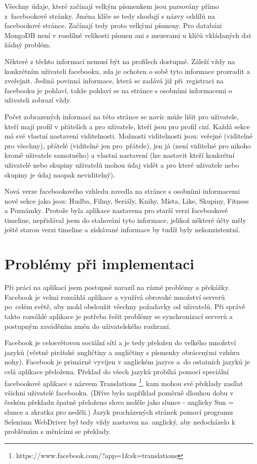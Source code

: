 \documentclass[thesis=M,czech]{FITthesis}[2013/05/10]
\begin{document}
Všechny údaje, které začínají velkým písmenkem jsou parsovány přímo z~facebookové stránky. Jména klíče se tedy shodují s názvy oddílů na facebookové stránce. Začínají tedy proto velkými písmeny. Pro databázi MongoDB není v rozdílné velikosti písmen ani s mezerami u klíčů vkládaných dat žádný problém.

Některé z těchto informací nemusí být na profilech dostupné. Záleží vždy na konkrétním uživateli facebooku, zda je ochoten o sobě tyto informace prozradit a zveřejnit. Jediná povinná informace, která se zadává již při~registraci na facebooku je pohlaví, takže pohlaví se na stránce s osobními informacemi o uživateli zobrazí vždy. 

Počet zobrazených informací na této stránce se navíc může lišit pro uživatele, kteří mají profil v přátelích a pro uživatele, kteří jsou pro profil cizí. Každá sekce má své vlastní nastavení viditelnosti. Možnosti viditelnosti jsou: veřejné (viditelné pro všechny), přátelé (viditelné jen pro~přátele), jen já (není viditelné pro nikoho kromě uživatele samotného) a vlastní nastavení (lze nastavit kteří konkrétní uživatelé nebo skupiny uživatelů mohou údaj vidět a pro které uživatele nebo skupiny je údaj naopak neviditelný).

Nová verze facebookového vzhledu zavedla na stránce s osobními informacemi nové sekce jako jsou: Hudba, Filmy, Seriály, Knihy, Místa, Like, Skupiny, Fitness a Poznámky. Protože byla aplikace nastavena pro starší verzi facebookové timeline, nepřidával jsem do stahování tyto informace, jelikož některé účty měly ještě starou verzi timeline a získávané informace by tudíž byly nekonzistentní.



\section{Problémy při implementaci}

Při práci na aplikaci jsem postupně narazil na různé problémy a překážky. Facebook je velmi rozsáhlá aplikace a využívá obrovské množství serverů po~celém světě, aby mohl obsloužit všechny požadavky od uživatelů. Při správě takto rozsáhlé aplikace je potřeba řešit problémy se synchronizací serverů a postupným zaváděním změn do uživatelského rozhraní.

Facebook je celosvětovou sociální sítí a je tedy přeložen do velkého množství jazyků (včetně pirátské angličtiny a angličtiny s písmenky obrácenými vzhůru nohy). Facebook je primárně vyvíjen v anglickém jazyce a~do ostatních jazyků je celá aplikace přeložena. Překlad do všech jazyků probíhá pomocí speciální facebookové aplikace s názvem Translations \footnote{https://www.facebook.com/?app=1\&sk=translations}, kam mohou své překlady zasílat všichni uživatelé facebooku. (Dříve bylo například poměrně dlouhou dobu v českém překladu špatně přeloženo slovo neděle jako slunce - anglicky Sun = slunce a zkratka pro neděli.) Jazyk procházených stránek pomocí programu Selenium WebDriver byl tedy vždy nastaven na~anglický, aby nedocházelo k problémům s měnícími se překlady. 
\end{document}
